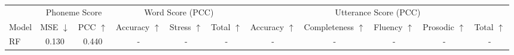 \documentclass{article}
\begin{document}
\begin{table*}[]
\small
\centering
\setlength\tabcolsep{4.3pt}
\begin{tabular}{lcccccccccc}
\hline
\multicolumn{1}{c}{}                        & \multicolumn{2}{c}{Phoneme  Score}                                                                                                                             & \multicolumn{3}{c}{Word Score (PCC)}                                                                                                                                                                                                          & \multicolumn{5}{c}{Utterance Score (PCC)}                                                                                                                                                                                                                                                                                                                                                                     \\ \cline{2-11} 
\multicolumn{1}{c}{\multirow{-2}{*}{Model}} & \multicolumn{1}{l}{MSE $\downarrow$}                                                       & \multicolumn{1}{c|}{PCC $\uparrow$}                                                     & Accuracy $\uparrow$                                                                      & Stress $\uparrow$                                                                     & \multicolumn{1}{c|}{Total $\uparrow$}                                                    & Accuracy $\uparrow$                                                                      & Completeness $\uparrow$                                                                  & Fluency $\uparrow$                                                                       & Prosodic $\uparrow$                                                                      & Total $\uparrow$                                                                         \\ \hline
RF~\cite{zhang2021speechocean762}                               & 0.130                                                                         & 0.440                                                                        & -                                                                             & -                                                                             & -                                                                             & -                                                                             & -                                                                             & -                                                                             & -                                                                             & -                                                                             \\

\end{tabular}
\end{table*}
\end{document}
